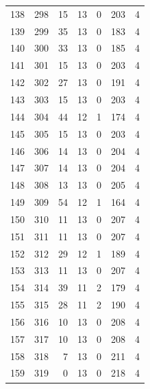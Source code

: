 \documentclass[a4paper,twoside,12pt]{book}
\begin{document}
\begin{appendices}
\begin{table}
\begin{tabular}{lrrrrrr}
		138 &    298 &        15 &        13 &               0 &             203 &         4 \\
		139 &    299 &        35 &        13 &               0 &             183 &         4 \\
		140 &    300 &        33 &        13 &               0 &             185 &         4 \\
		141 &    301 &        15 &        13 &               0 &             203 &         4 \\
		142 &    302 &        27 &        13 &               0 &             191 &         4 \\
		143 &    303 &        15 &        13 &               0 &             203 &         4 \\
		144 &    304 &        44 &        12 &               1 &             174 &         4 \\
		145 &    305 &        15 &        13 &               0 &             203 &         4 \\
		146 &    306 &        14 &        13 &               0 &             204 &         4 \\
		147 &    307 &        14 &        13 &               0 &             204 &         4 \\
		148 &    308 &        13 &        13 &               0 &             205 &         4 \\
		149 &    309 &        54 &        12 &               1 &             164 &         4 \\
		150 &    310 &        11 &        13 &               0 &             207 &         4 \\
		151 &    311 &        11 &        13 &               0 &             207 &         4 \\
		152 &    312 &        29 &        12 &               1 &             189 &         4 \\
		153 &    313 &        11 &        13 &               0 &             207 &         4 \\
		154 &    314 &        39 &        11 &               2 &             179 &         4 \\
		155 &    315 &        28 &        11 &               2 &             190 &         4 \\
		156 &    316 &        10 &        13 &               0 &             208 &         4 \\
		157 &    317 &        10 &        13 &               0 &             208 &         4 \\
		158 &    318 &         7 &        13 &               0 &             211 &         4 \\
		159 &    319 &         0 &        13 &               0 &             218 &         4 \\
		\bottomrule
	\end{tabular}		
\end{table}
   

\end{appendices}
\end{document}
